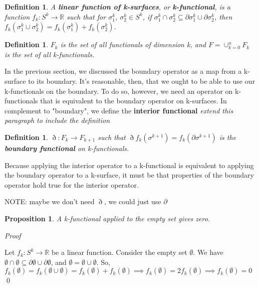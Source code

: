 \documentclass{book}
\newtheorem{defn}[equation]{Definition}
\newtheorem{prop}[equation]{Proposition}
\renewenvironment{proof}{\emph{Proof}}{\qed}
\begin{document}
\begin{defn}
	A \textbf{linear function of k-surfaces}, or \textbf{k-functional}, is a function $f_k : S^k \to \mathbb{R}$ such that for $\sigma^k_1$, $\sigma^k_2 \in S^k$, if $\sigma^k_1 \cap \sigma^k_2 \subseteq \partial \sigma^k_1 \cup \partial \sigma^k_2$, then $f_k(\sigma^k_1\cup \sigma^k_2) = f_k(\sigma^k_1) + f_k(\sigma^k_2)$. 
\end{defn}

\begin{defn}
	$F_k$ is the set of all functionals of dimension k, and $F = \cup_{k=0}^nF_k$ is the set of all k-functionals. 
\end{defn}

In the previous section, we discussed the boundary operator as a map from a k-surface to its boundary. It's reasonable, then, that we ought to be able to use our k-functionals on the boundary. To do so, however, we need an operator on k-functionals that is equivalent to the boundary operator on k-surfaces. In complement to "boundary", we define the \textbf{interior functional} \textit{extend this paragraph to include the definition}

\begin{defn}
	$\eth : F_k \to F_{k+1}$ such that $\eth f_k(\sigma^{k+1}) = f_k(\partial \sigma^{k+1})$ is the \textbf{boundary functional} on k-functionals. 
\end{defn}

Because applying the interior operator to a k-functional is equivalent to applying the boundary operator to a k-surface, it must be that properties of the boundary operator hold true for the interior operator. 

NOTE: maybe we don't need $\eth$, we could just use $\partial$

\begin{prop}
	A k-functional applied to the empty set gives zero. 
\end{prop}
\begin{proof}
	
	Let $f_k : S^k \to \mathbb{R}$ be a linear function. Consider the empty set $\emptyset$. 
We have $\emptyset \cap \emptyset \subseteq \partial\emptyset \cup \partial\emptyset$, and $\emptyset = \emptyset\cup\emptyset$. 
So, $f_k(\emptyset) = f_k(\emptyset\cup\emptyset) = f_k(\emptyset) + f_k(\emptyset) \implies f_k(\emptyset) = 2f_k(\emptyset) \implies f_k(\emptyset) = 0$
\end{proof}
\end{document}
